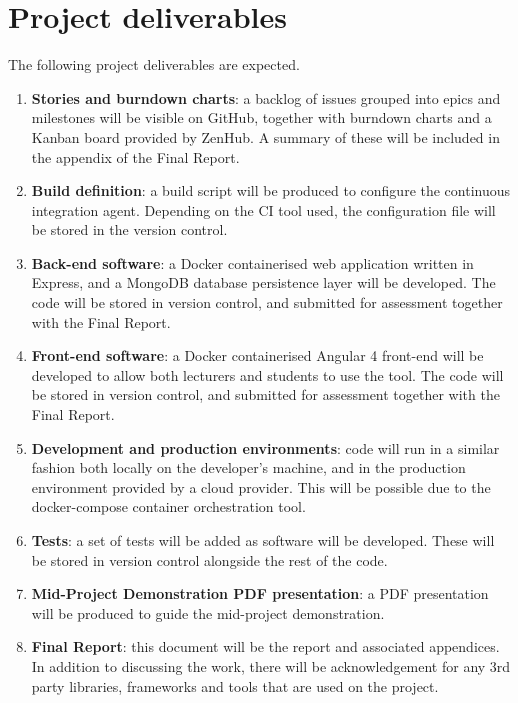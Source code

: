 \documentclass[11pt,fleqn,twoside]{article}
\begin{document}
\section{Project deliverables}
The following project deliverables are expected.
\begin{enumerate}
  \item \textbf{Stories and burndown charts}: a backlog of issues grouped into epics and milestones will be
    visible on GitHub, together with burndown charts and a Kanban board provided by ZenHub\cite{11}. A summary of these
    will be included in the appendix of the Final Report.
  \item \textbf{Build definition}: a build script will be produced to configure the continuous integration agent.
    Depending on the CI tool used, the configuration file will be stored in the version control.
  \item \textbf{Back-end software}: a Docker containerised web application written in Express, and a MongoDB database
    persistence layer will be developed. The code will be stored in version control, and submitted for assessment
    together with the Final Report.
  \item \textbf{Front-end software}: a Docker containerised Angular 4 front-end will be developed to allow both
    lecturers and students to use the tool. The code will be stored in version control, and submitted for assessment
    together with the Final Report.
  \item \textbf{Development and production environments}: code will run in a similar fashion both locally on the developer's
    machine, and in the production environment provided by a cloud provider. This will be possible due to the docker-compose
    container orchestration tool.
  \item \textbf{Tests}: a set of tests will be added as software will be developed. These will be stored in version
    control alongside the rest of the code.
  \item \textbf{Mid-Project Demonstration PDF presentation}: a PDF presentation will be produced to guide the
    mid-project demonstration.
  \item \textbf{Final Report}: this document will be the report and associated appendices. In addition to
    discussing the work, there will be acknowledgement for any 3rd party libraries, frameworks
    and tools that are used on the project.

\end{enumerate}
\end{document}
